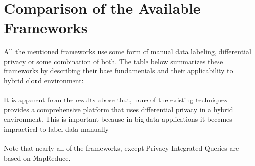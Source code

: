 \documentclass{report}
\begin{document}
\section{Comparison of the Available Frameworks}
\paragraph{}
All the mentioned frameworks use some form of manual data labeling, differential privacy or some combination of both. The table below summarizes these frameworks by describing their base fundamentals and their applicability to hybrid cloud environment:


\begin{table}[h]
\centering
\caption{Frameworks for privacy Oriented Analysis}
\label{Frameworks for privacy Oriented Analysis}
\end{table}
\paragraph{}
It is apparent from the results above that, none of the existing techniques provides a comprehensive platform that uses differential privacy in a hybrid environment. This is important because in big data applications it becomes impractical to label data manually.
\paragraph{}
Note that nearly all of the frameworks, except Privacy Integrated Queries are based on MapReduce.
\end{document}
